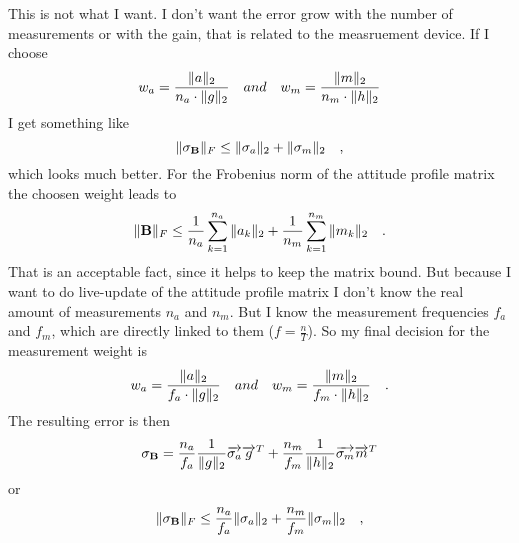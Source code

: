 This is not what I want. I don't want the error grow with the number of measurements or with the gain, that is related to the measruement device. If I choose
\begin{equation}
w_a = \frac{\Vert{a}\Vert_2}{n_a \cdot \Vert{g}\Vert_2} \quad and \quad w_m = \frac{\Vert{m}\Vert_2}{n_m \cdot \Vert{h}\Vert_2}
\end{equation}
I get something like
\begin{equation}
\Vert{\ensuremath{\mathbf{\sigma_B}}}\Vert_{F} \le \Vert{\sigma_a}\Vert_2 + \Vert{\sigma_m}\Vert_2 \quad , 
\end{equation}
which looks much better. For the Frobenius norm of the attitude profile matrix the choosen weight leads to
\begin{equation}
\Vert{\ensuremath{\mathbf{B}}}\Vert_{F} \le \frac{1}{n_a} \sum_{k=1}^{n_a} \Vert{a_k}\Vert_2 + \frac{1}{n_m} \sum_{k=1}^{n_m} \Vert{m_k}\Vert_2	\quad .
\end{equation}
That is an acceptable fact, since it helps to keep the matrix bound.
But because I want to do live-update of the attitude profile matrix I don't know the real amount of measurements $n_a$ and $n_m$. But I know the measurement frequencies $f_a$ and $f_m$, which are directly linked to them ($f = \tfrac n T $). So my final decision for the measurement weight is
\begin{equation}
w_a = \frac{\Vert{a}\Vert_2}{f_a \cdot \Vert{g}\Vert_2} \quad and \quad w_m = \frac{\Vert{m}\Vert_2}{f_m \cdot \Vert{h}\Vert_2} \quad .
\end{equation}
The resulting error is then
\begin{equation}
\mathbf{\sigma_B} = \frac{n_a}{f_a} \frac{1}{\Vert{g}\Vert_2} \overrightarrow{\sigma_a}\overrightarrow{g}^{T} + \frac{n_m}{f_m} \frac{1}{\Vert{h}\Vert_2} \overrightarrow{\sigma_m}\overrightarrow{m}^{T}
\end{equation}
or
\begin{equation}
\Vert{\ensuremath{\mathbf{\sigma_B}}}\Vert_{F} \le \frac{n_a}{f_a} \Vert{\sigma_a}\Vert_2 + \frac{n_m}{f_m} \Vert{\sigma_m}\Vert_2 \quad , 
\end{equation}